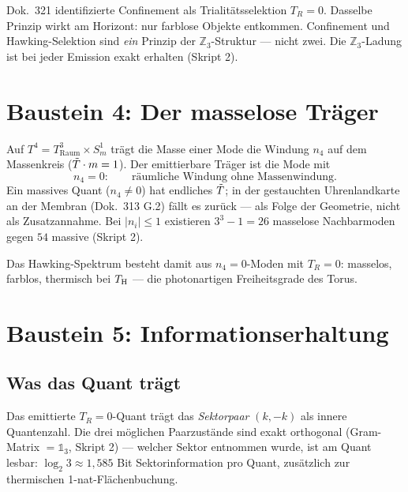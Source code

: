 \begin{tcolorbox}[ffgftbox, title={Confinement $=$ Hawking-Selektion \B}]
  Dok.\ 321 identifizierte Confinement als Trialitätsselektion $T_R = 0$.
  Dasselbe Prinzip wirkt am Horizont: nur farblose Objekte entkommen.
  Confinement und Hawking-Selektion sind \emph{ein} Prinzip
  der $\mathbb{Z}_3$-Struktur — nicht zwei.
  Die $\mathbb{Z}_3$-Ladung ist bei jeder Emission exakt erhalten
  (Skript 2).
\end{tcolorbox}

\section{Baustein 4: Der masselose Träger}

Auf $T^4 = T^3_{\mathrm{Raum}}\times S^1_m$ trägt die Masse einer Mode
die Windung $n_4$ auf dem Massenkreis ($\tilde{T}\cdot m = 1$).
Der emittierbare Träger ist die Mode mit
\begin{equation}
  n_4 = 0:\qquad \text{räumliche Windung ohne Massenwindung.}
\end{equation}
Ein massives Quant ($n_4 \neq 0$) hat endliches $\tilde{T}$; in der
gestauchten Uhrenlandkarte an der Membran (Dok.\ 313 G.2) fällt es
zurück — als Folge der Geometrie, nicht als Zusatzannahme.
Bei $|n_i| \leq 1$ existieren $3^3 - 1 = 26$ masselose
Nachbarmoden gegen $54$ massive (Skript 2). \K

Das Hawking-Spektrum besteht damit aus $n_4 = 0$-Moden mit $T_R = 0$:
masselos, farblos, thermisch bei $T_{\mathrm{H}}$ — die photonartigen Freiheitsgrade
des Torus.

\section{Baustein 5: Informationserhaltung}

\subsection{Was das Quant trägt}\label{sec:quant}

Das emittierte $T_R = 0$-Quant trägt das \emph{Sektorpaar} $(k, -k)$
als innere Quantenzahl. Die drei möglichen Paarzustände sind exakt
orthogonal (Gram-Matrix $= \mathbb{1}_3$, Skript 2) — welcher Sektor
entnommen wurde, ist am Quant lesbar:
$\log_2 3 \approx 1{,}585$ Bit Sektorinformation pro Quant,
zusätzlich zur thermischen 1-nat-Flächenbuchung.

